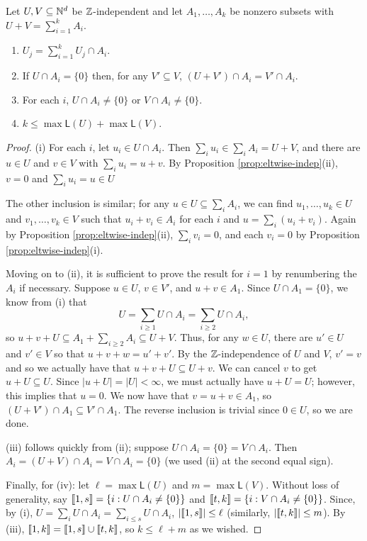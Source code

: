 \begin{prop} \label{prop:indep-decomp}
Let $U,V \subseteq \mathbb{N}^d$ be $\mathbb{Z}$-independent and let $A_1,\dots, A_k$ be nonzero subsets with $U+V = \sum_{i=1}^k A_i$.
\begin{enumerate}[label={\rm (\roman{*})}]
	\item $U_j = \sum_{i=1}^k U_j\cap A_i$.
	\item If $U \cap A_i = \{0\}$ then, for any $V'\subseteq V$, $(U+V')\cap A_i = V'\cap A_i$.
	\item For each $i$, $U\cap A_i \neq \{0\}$ or $V \cap A_i \neq \{0\}$.
	\item $k \le \max \mathsf{L}(U) + \max \mathsf{L}(V)$.
\end{enumerate}
\end{prop}

\begin{proof}
(i) For each $i$, let $u_i\in U\cap A_i$.
Then $\sum_i u_i \in \sum_i A_i = U+V$, and there are $u\in U$ and $v\in V$ with $\sum_i u_i = u+v$.
By Proposition \ref{prop:eltwise-indep}(ii), $v = 0$ and $\sum_i u_i = u \in U$

The other inclusion is similar; for any $u\in U \subseteq \sum_i A_i$, we can find $u_1,\dots,u_k\in U$ and $v_1,\dots, v_k\in V$ such that $u_i+v_i\in A_i$ for each $i$ and $u = \sum_i (u_i + v_i)$.
Again by Proposition \ref{prop:eltwise-indep}(ii), $\sum_i v_i = 0$, and each $v_i = 0$ by Proposition \ref{prop:eltwise-indep}(i).

Moving on to (ii), it is sufficient to prove the result for $i=1$ by renumbering the $A_i$ if necessary.
Suppose $u\in U$, $v\in V'$, and $u+v\in A_1$.
Since $U\cap A_1 = \{0\}$, we know from (i) that
\[ U = \sum_{i\ge 1} U\cap A_i = \sum_{i\ge 2} U\cap A_i, \]
so $u+v + U \subseteq A_1 + \sum_{i\ge 2} A_i \subseteq U+V$.
Thus, for any $w\in U$, there are $u'\in U$ and $v'\in V$ so that $u+v+w = u'+v'$.
By the $\mathbb{Z}$-independence of $U$ and $V$, $v' = v$ and so we actually have that $u+v+U \subseteq U + v$.
We can cancel $v$ to get $u+U \subseteq U$.
Since $|u+U| = |U| <\infty$, we must actually have $u+U = U$; however, this implies that $u = 0$.
We now have that $v = u+v \in A_1$, so $(U+V')\cap A_1 \subseteq V' \cap A_1$.
The reverse inclusion is trivial since $0\in U$, so we are done.

(iii) follows quickly from (ii); suppose $U\cap A_i = \{0\} = V\cap A_i$.
Then $A_i = (U+V)\cap A_i = V\cap A_i = \{0\}$ (we used (ii) at the second equal sign).

Finally, for (iv): let $\ell = \max \mathsf{L}(U)$ and $m = \max\mathsf{L}(V)$.
Without loss of generality, say $\llbracket 1,s \rrbracket = \{i: U\cap A_i \neq \{0\} \}$ and $\llbracket t,k \rrbracket = \{i: V\cap A_i \neq \{0\} \}$.
Since, by (i), $U = \sum_i U\cap A_i = \sum_{i\le s} U \cap A_i$, $| \llbracket 1,s \rrbracket | \le \ell$ (similarly, $|\llbracket t,k \rrbracket| \le m$).
By (iii), $\llbracket 1,k \rrbracket = \llbracket 1,s \rrbracket \cup \llbracket t,k \rrbracket$, so $k \le \ell + m$ as we wished.
\end{proof}


